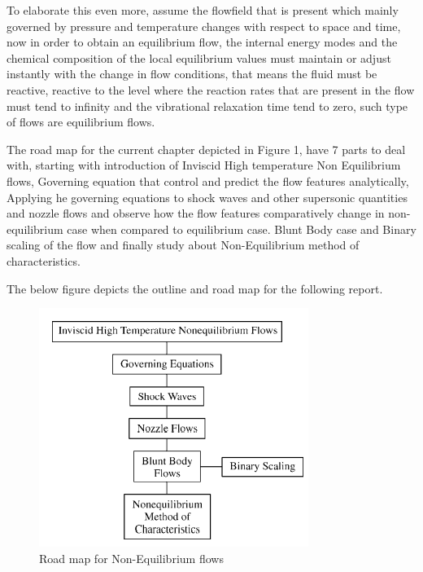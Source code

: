 \vspace{1cm}

To elaborate this even more, assume the flowfield that is present which mainly governed by pressure and temperature changes with respect to space and time, now in order to obtain an equilibrium flow, the internal energy modes and the chemical composition of the local equilibrium values must maintain or adjust instantly with the change in flow conditions, that means the fluid must be reactive, reactive to the level where the reaction rates that are present in the flow must tend to infinity and the vibrational relaxation time tend to zero, such type of flows are equilibrium flows. 
\vspace{1cm}

The road map for the current chapter depicted in Figure 1, have 7 parts to deal with, starting with introduction of Inviscid High temperature Non Equilibrium flows, Governing equation that control and predict the flow features analytically, Applying he governing equations to shock waves and other supersonic quantities and nozzle flows and observe how the flow features comparatively change in non-equilibrium case when compared to equilibrium case. Blunt Body case and Binary scaling of the flow and finally study about Non-Equilibrium method of characteristics.

The below figure depicts the outline and road map for the following report.


\begin{figure}
\centering
  \includegraphics[width=0.5\linewidth]{images/roadmap.png}
  \caption{Road map for Non-Equilibrium flows}
  \label{fig:boat1}
\end{figure}





